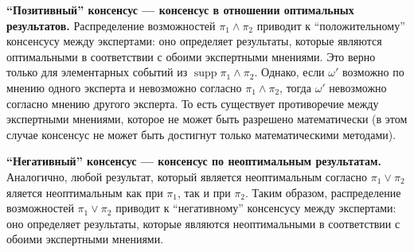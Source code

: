 \documentclass[a4paper, 14pt]{extarticle}
\DeclareMathOperator{\supp}{supp}
\begin{document}
\textbf{“Позитивный” консенсус --- консенсус в отношении оптимальных результатов.} Распределение возможностей $\pi_1 \land \pi_2$ приводит к “положительному” консенсусу между экспертами: оно определяет результаты, которые являются оптимальными в соответствии с обоими экспертными мнениями. Это верно только для элементарных событий из $\supp \pi_1 \land \pi_2$. Однако, если $\omega'$ возможно по мнению одного эксперта и невозможно согласно $\pi_1 \land \pi_2$, тогда $\omega'$ невозможно согласно мнению другого эксперта. То есть существует противоречие между экспертными мнениями, которое не может быть разрешено математически (в этом случае консенсус не может быть достигнут только математическими методами).

\textbf{“Негативный” консенсус --- консенсус по неоптимальным результатам.} Аналогично, любой результат, который является неоптимальным согласно  $\pi_1 \lor \pi_2$ яляется неоптимальным как при $\pi_1$, так и при $\pi_2$. Таким образом, распределение возможностей $\pi_1 \lor \pi_2$ приводит к “негативному” консенсусу между экспертами: оно определяет результаты, которые являются неоптимальными в соответствии с обоими экспертными мнениями.
\end{document}
